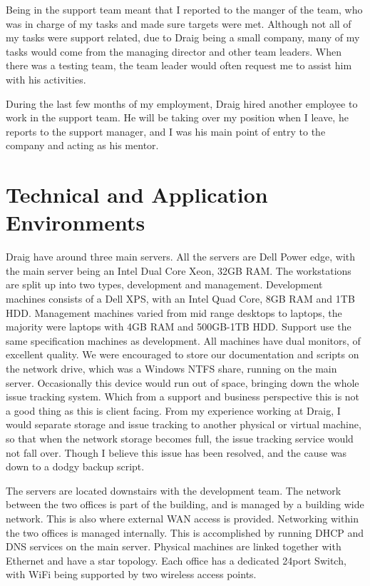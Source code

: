 \documentclass[paper=a4, fontsize=11pt]{scrartcl}	%
\begin{document}
Being in the support team meant that I reported to the manger of the team, who was in charge of my tasks and made sure targets were met. Although not all of my tasks were support related, due to Draig being a small company, many of my tasks would come from the managing director and other team leaders. When there was a testing team, the team leader would often request me to assist him with his activities.

During the last few months of my employment, Draig hired another employee to work in the support team. He will be taking over my position when I leave, he reports to the support manager, and I was his main point of entry to the company and acting as his mentor.

\section{Technical and Application Environments}
Draig have around three main servers. All the servers are Dell Power edge, with the main server being an Intel Dual Core Xeon, 32GB RAM. The workstations are split up into two types, development and management. Development machines consists of a Dell XPS, with an Intel Quad Core, 8GB RAM and 1TB HDD. Management machines varied from mid range desktops to laptops, the majority were laptops with 4GB RAM and 500GB-1TB HDD. Support use the same specification machines as development. All machines have dual monitors, of excellent quality. We were encouraged to store our documentation and scripts on the network drive, which was a Windows NTFS share, running on the main server. Occasionally this device would run out of space, bringing down the whole issue tracking system. Which from a support and business perspective this is not a good thing as this is client facing. From my experience working at Draig, I would separate storage and issue tracking to another physical or virtual machine, so that when the network storage becomes full, the issue tracking service would not fall over. Though I believe this issue has been resolved, and the cause was down to a dodgy backup script. 

The servers are located downstairs with the development team. The network between the two offices is part of the building, and is managed by a building wide network. This is also where external WAN access is provided\cite{fiberspeed}. Networking within the two offices is managed internally. This is accomplished by running DHCP and DNS services on the main server. Physical machines are linked together with Ethernet and have a star topology. Each office has a dedicated 24port Switch, with WiFi being supported by two wireless access points.
\end{document}
